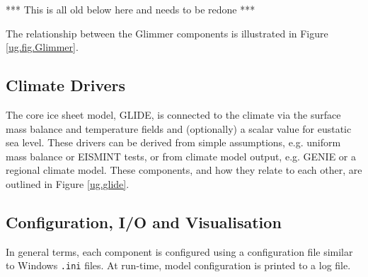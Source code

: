 \begin{itemize}
\end{itemize}
%
*** This is all old below here and needs to be redone ***

The relationship between the Glimmer components is illustrated in Figure \ref{ug.fig.Glimmer}. 
%
\subsection{Climate Drivers}
\label{subsec:climdrive}
The core ice sheet model, GLIDE, is connected to the climate via the surface mass balance and temperature fields and (optionally) a scalar value for eustatic sea level. These drivers can be derived from simple assumptions, e.g. uniform mass balance or EISMINT tests, or from climate model output, e.g. GENIE or a regional climate model. These components, and how they relate to each other, are outlined in Figure \ref{ug.glide}.
%
%
\subsection{Configuration, I/O and Visualisation}
In general terms, each component is configured using a configuration file similar to Windows \texttt{.ini} files. At run-time, model configuration is printed to a log file. 

